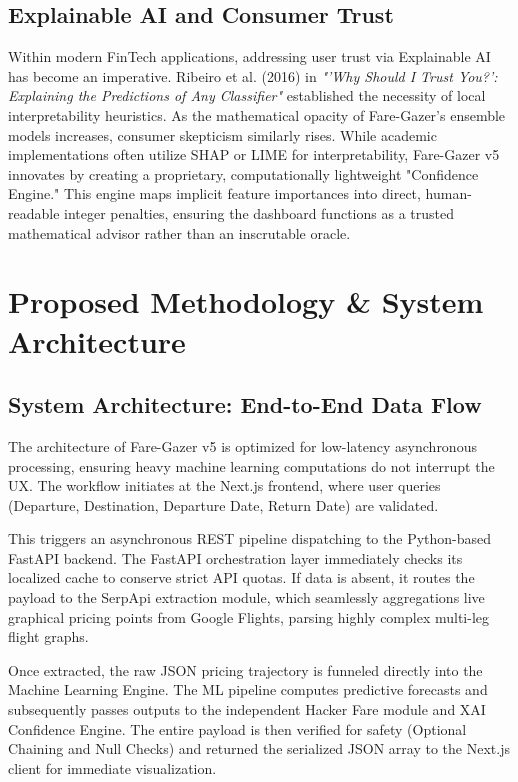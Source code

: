 \documentclass[12pt, a4paper]{article}
\begin{document}
\subsection{Explainable AI and Consumer Trust}
Within modern FinTech applications, addressing user trust via Explainable AI has become an imperative. Ribeiro et al. (2016) in \textit{"'Why Should I Trust You?': Explaining the Predictions of Any Classifier"} established the necessity of local interpretability heuristics. As the mathematical opacity of Fare-Gazer's ensemble models increases, consumer skepticism similarly rises. While academic implementations often utilize SHAP or LIME for interpretability, Fare-Gazer v5 innovates by creating a proprietary, computationally lightweight "Confidence Engine." This engine maps implicit feature importances into direct, human-readable integer penalties, ensuring the dashboard functions as a trusted mathematical advisor rather than an inscrutable oracle.

\newpage

\section{Proposed Methodology \& System Architecture}

\subsection{System Architecture: End-to-End Data Flow}
The architecture of Fare-Gazer v5 is optimized for low-latency asynchronous processing, ensuring heavy machine learning computations do not interrupt the UX. The workflow initiates at the Next.js frontend, where user queries (Departure, Destination, Departure Date, Return Date) are validated. 

This triggers an asynchronous REST pipeline dispatching to the Python-based FastAPI backend. The FastAPI orchestration layer immediately checks its localized cache to conserve strict API quotas. If data is absent, it routes the payload to the SerpApi extraction module, which seamlessly aggregations live graphical pricing points from Google Flights, parsing highly complex multi-leg flight graphs. 

Once extracted, the raw JSON pricing trajectory is funneled directly into the Machine Learning Engine. The ML pipeline computes predictive forecasts and subsequently passes outputs to the independent Hacker Fare module and XAI Confidence Engine. The entire payload is then verified for safety (Optional Chaining and Null Checks) and returned the serialized JSON array to the Next.js client for immediate visualization.
\end{document}
